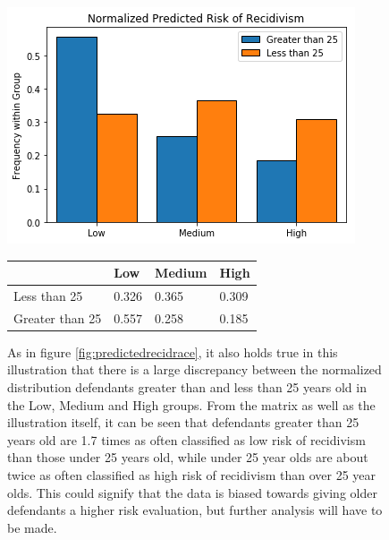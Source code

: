 \documentclass[11pt, fleqn, titlepage]{article}
\begin{document}
	
	\begin{figure}[H]
		\centering
		\includegraphics[width=0.5\linewidth]{imgs/normalized_recid_age}	
		\begin{table}[H]
			\centering
			\begin{tabular}{|l|l|l|l|}
				\hline
				& Low   & Medium & High  \\ \hline
				Less than 25    & 0.326 & 0.365  & 0.309 \\ \hline
				Greater than 25 & 0.557 & 0.258  & 0.185 \\ \hline
			\end{tabular}
		\end{table}
		\caption{As in figure \ref{fig:predictedrecidrace}, it also holds true in this illustration that there is a large discrepancy between the normalized distribution defendants greater than and less than 25 years old in the Low, Medium and High groups. From the matrix as well as the illustration itself, it can be seen that defendants greater than 25 years old are 1.7 times as often classified as low risk of recidivism than those under 25 years old, while under 25 year olds are about twice as often classified as high risk of recidivism than over 25 year olds. This could signify that the data is biased towards giving older defendants a higher risk evaluation, but further analysis will have to be made.}
		\label{fig:predictedrecidrage}
	\end{figure}
	
\end{document}
